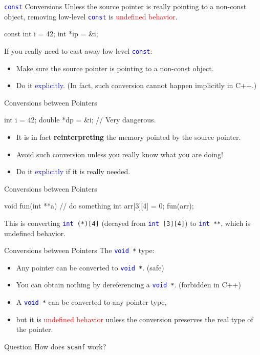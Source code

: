 \documentclass{beamer}
\newcommand{\red}[1]{\textcolor{red}{#1}}
\newcommand{\blue}[1]{\textcolor{blue}{#1}}
\newcommand{\ttt}[1]{\texttt{#1}}
\newcommand{\bluett}[1]{\blue{\ttt{#1}}}
\newenvironment{question}{\begin{alertblock}{Question}}{\end{alertblock}}
\theoremstyle{definition}
\begin{document}
\begin{frame}[fragile]{\bluett{const} Conversions}
    Unless the source pointer is really pointing to a non-const object, removing low-level \bluett{const} is \red{undefined behavior}.
    \begin{cpp}
const int i = 42;
int *ip = &i;
    \end{cpp}
    \pause
    If you really need to cast away low-level \bluett{const}:
    \begin{itemize}
        \item Make sure the source pointer is pointing to a non-const object.
        \item Do it \blue{explicitly}. (In fact, such conversion cannot happen implicitly in C++.)
    \end{itemize}
\end{frame}

\begin{frame}[fragile]{Conversions between Pointers}
    \begin{cpp}
int i = 42;
double *dp = &i; // Very dangerous.
    \end{cpp}
    \begin{itemize}
        \item It is in fact \textbf{reinterpreting} the memory pointed by the source pointer.
        \item Avoid such conversion unless you really know what you are doing!
        \item Do it \blue{explicitly} if it is really needed.
    \end{itemize}
\end{frame}

\begin{frame}[fragile]{Conversions between Pointers}
    \begin{cpp}
void fun(int **a) {
  // do something
}
int arr[3][4] = {0};
fun(arr);
    \end{cpp}
    This is converting \bluett{int }\ttt{(*)[4]} (decayed from \bluett{int }\ttt{[3][4]}) to \bluett{int }\ttt{**}, which is undefined behavior.
\end{frame}

\begin{frame}{Conversions between Pointers}
    The \bluett{void }\ttt{*} type:
    \begin{itemize}
        \item Any pointer can be converted to \bluett{void }\ttt{*}. (safe)
        \item You can obtain nothing by dereferencing a \bluett{void }\ttt{*}. (forbidden in C++)
        \pause
        \item A \bluett{void }\ttt{*} can be converted to any pointer type,
        \item but it is \red{undefined behavior} unless the conversion preserves the real type of the pointer.
    \end{itemize}
    \pause
    \begin{question}
        How does \ttt{scanf} work?
    \end{question}
\end{frame}
\end{document}
